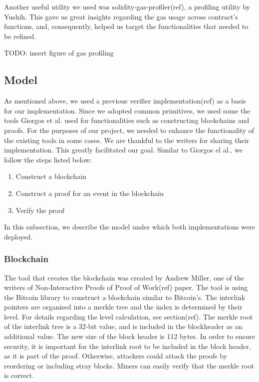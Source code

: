\documentclass{article}
\begin{document}
  Another useful utility we used was solidity-gas-profiler(ref), a
  profiling utility by Yushih. This gave us great insights regarding the
  gas usage across contract’s functions, and, consequently, helped us
  target the functionalities that needed to be refined.

  TODO: insert figure of gas profiling

  \subsection{Model}

  As mentioned above, we used a previous verifier implementation(ref) as
  a basis for our implementation. Since we adopted common primitives, we
  used some the tools Giorgos et al. used for functionalities such as
  constructing blockchains and proofs. For the purposes of our project,
  we needed to enhance the functionality of the existing tools in some
  cases. We are thankful to the writers for sharing their
  implementation. This greatly facilitated our goal. Similar to Giorgos
  el al., we follow the steps listed below:

  \begin{enumerate}
  \item
    Construct a blockchain
  \item
    Construct a proof for an event in the blockchain
  \item
    Verify the proof
  \end{enumerate}

  In this subsection, we describe the model under which both
  implementations were deployed.

  \subsubsection{Blockchain}

  The tool that creates the blockchain was created by Andrew Miller, one
  of the writers of Non-Interactive Proofs of Proof of Work(ref) paper.
  The tool is using the Bitcoin library to construct a blockchain
  similar to Bitcoin’s. The interlink pointers are organised into a
  merkle tree and the index is determined by their level. For details
  regarding the level calculation, see section(ref). The merkle root of
  the interlink tree is a 32-bit value, and is included in the
  blockheader as an additional value. The new size of the block header
  is 112 bytes. In order to ensure security, it is important for the
  interlink root to be included in the block header, as it is part of
  the proof. Otherwise, attackers could attack the proofs by reordering
  or including stray blocks. Miners can easily verify that the merkle
  root is correct.
\end{document}
